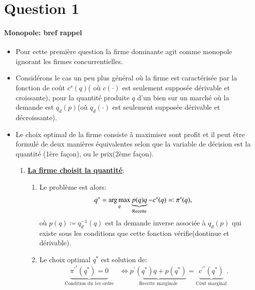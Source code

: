 \section{Question 1}
\frame{\sectionpage}
\begin{frame}
  [allowframebreaks]{\insertsection}
  \framesubtitle{Monopole: bref rappel}
  \begin{itemize}
  \item Pour cette première question la firme dominante agit comme monopole ignorant les firmes concurrentielles.
  \item Considérons le cas un peu plus général où la firme est caractérisée par la fonction de coût $c^s(q)$( où $c(\cdot)$ est seulement supposée dérivable et croissante), pour la quantité produite $q$ d'un bien sur un marché où la demande est $q_d(p)$(où $q_d(\cdot)$ est seulement supposée dérivable et décroissante).
  \item Le choix optimal de la firme consiste à maximiser sont profit et il peut être formulé de deux manières équivalentes selon que la variable de décision est la quantité (1ère façon), ou le prix(2ème façon).
  \begin{enumerate}
  \item \textbf{\underline{La firme choisit la quantité}}:
  \begin{enumerate}[$\cdot$]
  \item Le problème est alors:
  \begin{align}
  q^* &= \argmax_{q} \underbrace{p(q)q}_{\text{Recette}} - c^s(q)\eqqcolon \pi^s(q), \label{eq7}
  \end{align}
  où $p(q)\coloneqq q_d^{-1}(q)$ est la demande inverse associée à $q_d(p)$ qui existe sous les conditions que cette fonction vérifie(dontinue et dérivable).
  \item  Le choix optimal $q^*$ est solution de:
  \begin{align}
  \underbrace{\pi^{\prime^s}(q^*) = 0}_{\text{Condition du 1er ordre}} &\Leftrightarrow   \underbrace{p^\prime(q^*) q + p(q^*)}_{\text{Recette marginale}} = \underbrace{c^{\prime^s}(q^*)}_{\text{Côut marginal}}. 
  \label{eq8}
  \end{align}
  \end{enumerate}


\end{enumerate}
\end{itemize}
\end{frame}
